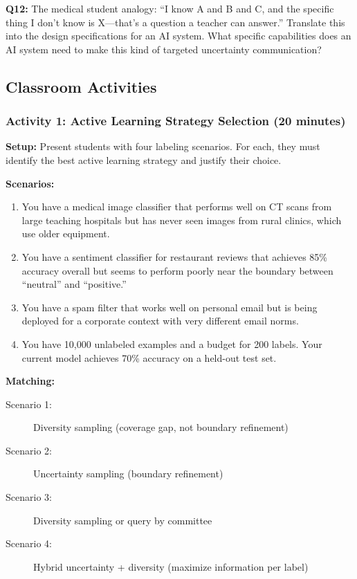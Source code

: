 \textbf{Q12:} The medical student analogy: ``I know A and B and C, and the specific thing I don't know is X---that's a question a teacher can answer.'' Translate this into the design specifications for an AI system. What specific capabilities does an AI system need to make this kind of targeted uncertainty communication?

\subsection*{Classroom Activities}

\subsubsection*{Activity 1: Active Learning Strategy Selection (20 minutes)}

\textbf{Setup:} Present students with four labeling scenarios. For each, they must identify the best active learning strategy and justify their choice.

\textbf{Scenarios:}
\begin{enumerate}
    \item You have a medical image classifier that performs well on CT scans from large teaching hospitals but has never seen images from rural clinics, which use older equipment.
    \item You have a sentiment classifier for restaurant reviews that achieves 85\% accuracy overall but seems to perform poorly near the boundary between ``neutral'' and ``positive.''
    \item You have a spam filter that works well on personal email but is being deployed for a corporate context with very different email norms.
    \item You have 10,000 unlabeled examples and a budget for 200 labels. Your current model achieves 70\% accuracy on a held-out test set.
\end{enumerate}

\textbf{Matching:}
\begin{description}
    \item[Scenario 1:] Diversity sampling (coverage gap, not boundary refinement)
    \item[Scenario 2:] Uncertainty sampling (boundary refinement)
    \item[Scenario 3:] Diversity sampling or query by committee
    \item[Scenario 4:] Hybrid uncertainty + diversity (maximize information per label)
\end{description}

